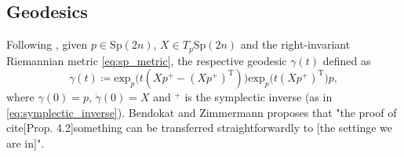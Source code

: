 \subsection{Geodesics}

Following \cite[Prop.~2.1]{BendokatZimmermann2021}, given $p\in \mathrm{Sp}(2n)$,  $X\in T_{p}\mathrm{Sp}(2n)$ and the right-invariant Riemannian metric \eqref{eq:sp_metric}, the respective geodesic $\gamma(t)$ defined as
\begin{equation*}
    \gamma(t)\coloneqq \mathrm{exp}_{p}\big(t(Xp^{+}-(Xp^{+}) ^{\mathrm{T}})\big)\mathrm{exp}_{p}\big(t(Xp^{+})^{\mathrm{T}}\big)p,
\end{equation*}
where $\gamma(0)=p$, $\dot{\gamma}(0)=X$ and $^{+}$ is the symplectic inverse (as in \ref{eq:symplectic_inverse}). Bendokat and Zimmermann proposes that "the proof of cite[Prop. 4.2]{something} can be transferred straightforwardly to [the settinge we are in]". 